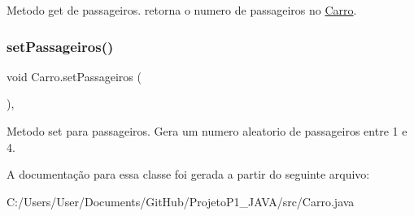 Metodo get de passageiros. retorna o numero de passageiros no \mbox{\hyperlink{class_carro}{Carro}}. \mbox{\label{class_carro_a154dc6a973a0b8e345bffcdfd4721615}} 
\subsubsection{\texorpdfstring{set\+Passageiros()}{setPassageiros()}}
{\footnotesize\ttfamily void Carro.\+set\+Passageiros (\begin{DoxyParamCaption}{ }\end{DoxyParamCaption})\hspace{0.3cm}{\ttfamily [inline]}, {\ttfamily [private]}}

Metodo set para passageiros. Gera um numero aleatorio de passageiros entre 1 e 4. 

A documentação para essa classe foi gerada a partir do seguinte arquivo\+:\begin{DoxyCompactItemize}
\item 
C\+:/\+Users/\+User/\+Documents/\+Git\+Hub/\+Projeto\+P1\+\_\+\+J\+A\+V\+A/src/Carro.\+java\end{DoxyCompactItemize}
